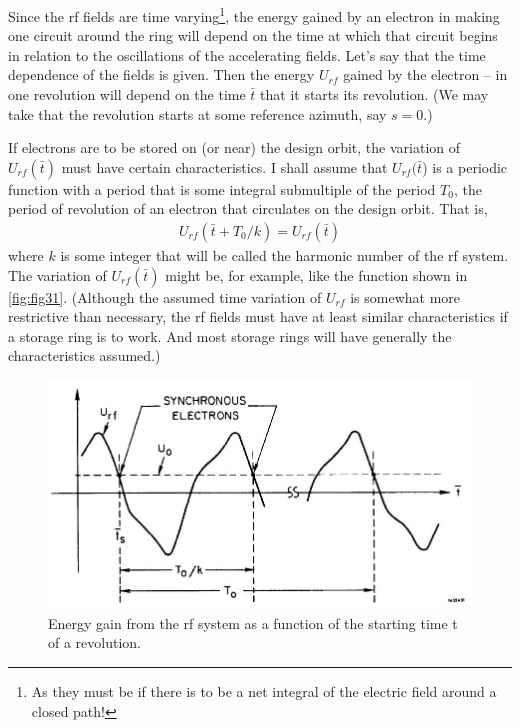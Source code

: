 Since the rf fields are time varying\footnote{As they must be if there is to be a net integral of the electric field around a closed path!}, the energy gained by an electron in making one circuit around the ring will depend on the time at which that circuit begins in relation to the oscillations of the accelerating fields. Let's say that the time dependence of the fields is given. Then the energy $U_{rf}$ gained by the electron -- in one revolution will depend on the time $\bar{t}$ that it starts its revolution. (We may take that the revolution starts at some reference azimuth, say $s = 0$.)

If electrons are to be stored on (or near) the design orbit, the variation of $U_{rf}(\bar{t})$ must have certain characteristics. I shall assume that $U_{rf}(\bar{t}$) is a periodic function with a period that is some integral submultiple of the period $T_0$, the period of revolution of an electron that circulates on the design orbit. That is,
\begin{align}
	U_{rf}(\bar{t}+T_0/k) = U_{rf}(\bar{t})\label{eq:3.25}
\end{align}
where $k$ is some integer that will be called the harmonic number of the rf system. The variation of $U_{rf}(\bar{t})$ might be, for example, like the function shown in \autoref{fig:fig31}. (Although the assumed time variation of $U_{rf}$ is somewhat more restrictive than necessary, the rf fields must have at least similar characteristics if a storage ring is to work. And most storage rings will have generally the characteristics assumed.)

\begin{figure}[!htb]
	\centering
	\includegraphics[width=0.85\linewidth]{./Figuras/fig31.jpeg}
	\caption{Energy gain from the rf system as a function of the starting time t of a revolution.}
	\label{fig:fig31}
\end{figure}

